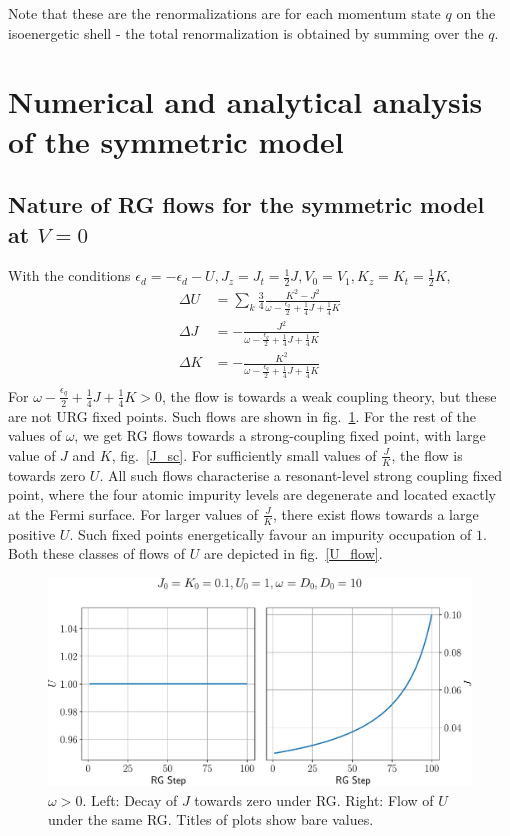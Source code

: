 \documentclass[twoside]{report}
\numberwithin{equation}{section}
\begin{document}
Note that these are the renormalizations are for each momentum state \(q\) on the isoenergetic shell - the total renormalization is obtained by summing over the \(q\).
\section{Numerical and analytical analysis of the symmetric model}
\subsection{Nature of RG flows for the symmetric model at \(V = 0\)}
With the conditions \(\epsilon_d = -\epsilon_d - U, J_z = J_t = \frac{1}{2}J, V_0 = V_1, K_z = K_t = \frac{1}{2}K\),
\begin{equation}\begin{aligned}
	\Delta U &= \sum_k \frac{3}{4}\frac{K^2 - J^2}{\omega - \frac{\epsilon_q}{2} + \frac{1}{4}J + \frac{1}{4}K} \\
	\Delta J &= - \frac{J^2}{\omega - \frac{\epsilon_q}{2} + \frac{1}{4}J + \frac{1}{4}K}\\
	\Delta K &= - \frac{K^2}{\omega - \frac{\epsilon_q}{2} + \frac{1}{4}J + \frac{1}{4}K}\\
\end{aligned}\end{equation}
For \(\omega - \frac{\epsilon_q}{2} + \frac{1}{4}J + \frac{1}{4}K > 0\), the flow is towards a weak coupling theory, but these are not URG fixed points. Such flows are shown in fig.~\ref{Jdecay}. For the rest of the values of \(\omega\), we get RG flows towards a strong-coupling fixed point, with large value of \(J\) and \(K\), fig.~\ref{J_sc}. For sufficiently small values of \(\frac{J}{K}\), the flow is towards zero \(U\). All such flows characterise a resonant-level strong coupling fixed point, where the four atomic impurity levels are degenerate and located exactly at the Fermi surface. For larger values of \(\frac{J}{K}\), there exist flows towards a large positive \(U\). Such fixed points energetically favour an impurity occupation of \(1\). Both these classes of flows of \(U\) are depicted in fig.~\ref{U_flow}.
\begin{figure}[htpb]
	\centering
	\includegraphics[width=\textwidth]{../figures/large_w.pdf}
	\caption{\(\omega > 0\). Left: Decay of \(J\) towards zero under RG. Right: Flow of \(U\) under the same RG. Titles of plots show bare values.}
	\label{Jdecay}
\end{figure}
\end{document}
